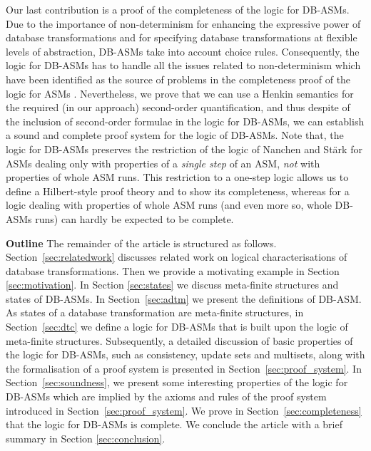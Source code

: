 \documentclass[preprint,11pt]{elsarticle}
\theoremstyle{definition}
\theoremstyle{remark}
\begin{document}
Our last contribution is a proof of the completeness of the logic for
DB-ASMs. Due to the importance of non-determinism for enhancing
   the expressive power of database transformations and for specifying database transformations at flexible levels of abstraction, DB-ASMs take into account choice rules. Consequently, the logic for DB-ASMs has to handle
   all the issues related to non-determinism which have been identified as the source of problems in the completeness proof of the logic for ASMs \cite{RobertLogicASM, [BS03]}. Nevertheless, we prove that we can use a Henkin semantics for the required (in our approach) second-order quantification, and thus despite of the inclusion of second-order formulae in the logic for DB-ASMs, we can establish a sound and complete proof system for the logic of DB-ASMs. Note that, the logic for DB-ASMs preserves the restriction of the logic of Nanchen and St\"ark for ASMs \cite{RobertLogicASM} dealing only with properties of a \emph{single step} of an ASM, \emph{not} with properties of whole ASM runs. This restriction to a one-step logic allows us to define a Hilbert-style proof theory and to show its completeness, whereas for a logic dealing with properties of whole ASM runs (and even more so, whole DB-ASMs runs) can hardly be expected to be complete.



\medskip\noindent \textbf{Outline}\hspace{0.2cm} The remainder of the article is structured as follows. Section~\ref{sec:relatedwork} discusses related work on logical
characterisations of database transformations. Then we provide a motivating example in Section \ref{sec:motivation}. In Section \ref{sec:states} we discuss meta-finite structures and states of DB-ASMs. In Section~\ref{sec:adtm} we present the definitions of DB-ASM.
As states of a database transformation are meta-finite structures, in Section~\ref{sec:dtc}
we define a logic for DB-ASMs that is built upon the logic of
meta-finite structures. Subsequently, a
detailed discussion of basic properties of the logic for DB-ASMs, such as
consistency, update sets and multisets, along with
the formalisation of a proof system is presented in Section~\ref{sec:proof_system}.
In Section~\ref{sec:soundness}, we present some interesting properties of the logic for DB-ASMs which are implied by the axioms and rules of the proof system introduced in Section~\ref{sec:proof_system}.  We prove in Section~\ref{sec:completeness} that the logic for DB-ASMs is complete. We conclude the article with a brief summary in Section \ref{sec:conclusion}.
\end{document}
